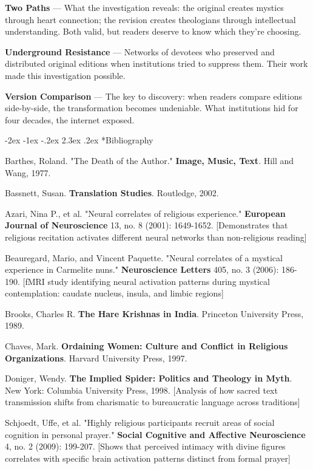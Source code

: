 \documentclass[12pt,twoside]{book}
\makeatletter
\def\cleardoublepage{\clearpage\if@twoside \ifodd\c@page\else\hbox{}\thispagestyle{empty}\newpage\if@twocolumn\hbox{}\newpage\fi\fi\fi}
\renewcommand\section{\@startsection{section}{1}{\z@}%
{-2ex \@plus -1ex \@minus -.2ex}%
{2.3ex \@plus.2ex}%
{\normalfont\Large\bfseries}}
\makeatother
\begin{document}
\textbf{Two Paths} — What the investigation reveals: the original creates mystics through heart connection; the revision creates theologians through intellectual understanding. Both valid, but readers deserve to know which they're choosing.

\textbf{Underground Resistance} — Networks of devotees who preserved and distributed original editions when institutions tried to suppress them. Their work made this investigation possible.

\textbf{Version Comparison} — The key to discovery: when readers compare editions side-by-side, the transformation becomes undeniable. What institutions hid for four decades, the internet exposed.

\cleardoublepage
\section*{Bibliography}
\thispagestyle{sectionopening}

Barthes, Roland. "The Death of the Author." \textbf{Image, Music, Text}. Hill and Wang, 1977.

Bassnett, Susan. \textbf{Translation Studies}. Routledge, 2002.

Azari, Nina P., et al. "Neural correlates of religious experience." \textbf{European Journal of Neuroscience} 13, no. 8 (2001): 1649-1652. [Demonstrates that religious recitation activates different neural networks than non-religious reading]

Beauregard, Mario, and Vincent Paquette. "Neural correlates of a mystical experience in Carmelite nuns." \textbf{Neuroscience Letters} 405, no. 3 (2006): 186-190. [fMRI study identifying neural activation patterns during mystical contemplation: caudate nucleus, insula, and limbic regions]

Brooks, Charles R. \textbf{The Hare Krishnas in India}. Princeton University Press, 1989.

Chaves, Mark. \textbf{Ordaining Women: Culture and Conflict in Religious Organizations}. Harvard University Press, 1997.

Doniger, Wendy. \textbf{The Implied Spider: Politics and Theology in Myth}. New York: Columbia University Press, 1998. [Analysis of how sacred text transmission shifts from charismatic to bureaucratic language across traditions]

Schjoedt, Uffe, et al. "Highly religious participants recruit areas of social cognition in personal prayer." \textbf{Social Cognitive and Affective Neuroscience} 4, no. 2 (2009): 199-207. [Shows that perceived intimacy with divine figures correlates with specific brain activation patterns distinct from formal prayer]
\end{document}
